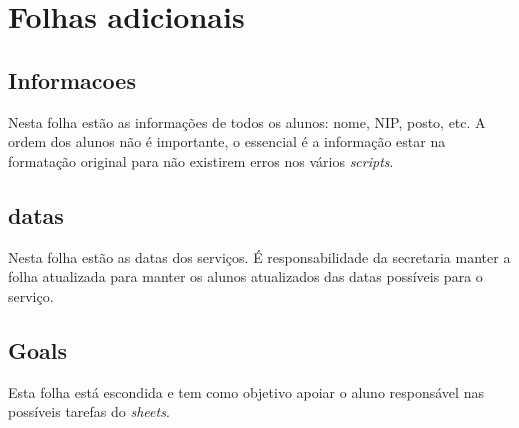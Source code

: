 \section{Folhas adicionais}

\subsection{Informacoes}

Nesta folha estão as informações de todos os alunos: nome, NIP, posto, etc. A ordem dos alunos não é importante, o essencial é a informação estar na formatação original para não existirem erros nos vários \textit{scripts}.

\subsection{datas}

Nesta folha estão as datas dos serviços. É responsabilidade da secretaria manter a folha atualizada para manter os alunos atualizados das datas possíveis para o serviço.

\subsection{Goals}

Esta folha está escondida e tem como objetivo apoiar o aluno responsável nas possíveis tarefas do \textit{sheets}.